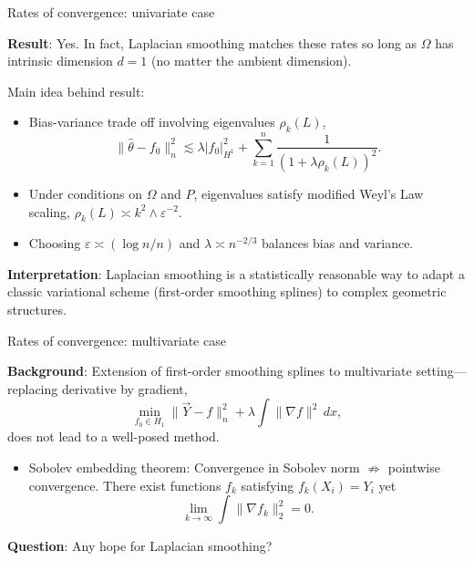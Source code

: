 \documentclass[xcolor=dvipsnames]{beamer}
\newcommand{\wh}[1]{\widehat{#1}}
\begin{document}
\begin{frame}[t]{Rates of convergence: univariate case}

{\bf Result}: Yes. In fact, Laplacian smoothing matches these rates so long as $\Omega$ has \alert{intrinsic dimension} $d = 1$ (no matter the ambient dimension).
\vspace{.2 in}
\pause

Main idea behind result: 
\begin{itemize}
	\item \alert{Bias-variance} trade off involving eigenvalues $\rho_k(L)$,
	\begin{equation*}
	\|\wh{\theta} - f_0\|_n^2 \lesssim \lambda |f_0|_{H^1}^2 + \sum_{k = 1}^{n}\frac{1}{(1 + \lambda \rho_k(L))^2}.
	\end{equation*}
	\item Under conditions on $\Omega$ and $P$, eigenvalues satisfy \alert{modified Weyl's Law} scaling, $\rho_k(L) \asymp k^{2} \wedge \varepsilon^{-2}$.
	\item Choosing $\varepsilon \asymp (\log n/n)$ and $\lambda \asymp n^{-2/3}$ balances bias and variance.
\end{itemize}
\pause 
{\bf Interpretation}: Laplacian smoothing is a statistically reasonable way to adapt a classic variational scheme (first-order smoothing splines) to complex geometric structures. 
\end{frame}

\begin{frame}[t]{Rates of convergence: multivariate case}

{\bf Background}: Extension of first-order smoothing splines to multivariate setting---replacing derivative by gradient,
\begin{equation*}
\min_{f_0 \in H_1} \|\vec{Y} - f\|_n^2 + \lambda \int \|\nabla f\|^2 \,dx,
\end{equation*}
does not lead to a well-posed method.\pause
\begin{itemize}
	\item \alert{Sobolev embedding theorem}: Convergence in Sobolev norm $\not\Longrightarrow$ pointwise convergence. There exist functions $f_k$ satisfying $f_k(X_i) = Y_i$ yet 
	$$\lim_{k \to \infty} \int \|\nabla f_k\|_2^2 = 0.$$
\end{itemize}
\pause
{\bf Question}: Any hope for Laplacian smoothing?
\end{frame}
\end{document}
